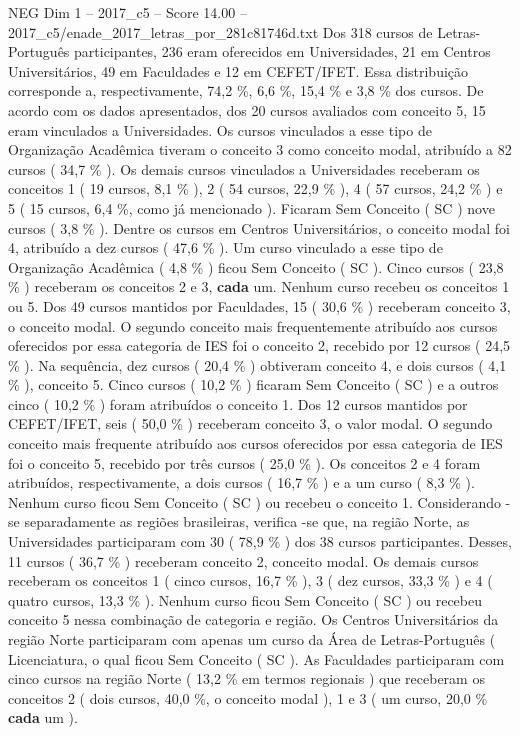 \begin{textsample}{NEG Dim 1 – 2017\_c5 – Score 14.00 – 2017\_c5/enade\_2017\_letras\_por\_281c81746d.txt}
Dos 318 cursos de Letras-Português participantes, 236 eram oferecidos em Universidades, 21 em Centros Universitários, 49 em Faculdades e 12 em CEFET/IFET.
Essa distribuição corresponde a, respectivamente, 74,2 \%, 6,6 \%, 15,4 \% e 3,8 \% dos cursos.
De acordo com os dados apresentados, dos 20 cursos avaliados com conceito 5, 15 eram vinculados a Universidades.
Os cursos vinculados a esse tipo de Organização Acadêmica tiveram o conceito 3 como conceito modal, atribuído a 82 cursos ( 34,7 \% ).
Os demais cursos vinculados a Universidades receberam os conceitos 1 ( 19 cursos, 8,1 \% ), 2 ( 54 cursos, 22,9 \% ), 4 ( 57 cursos, 24,2 \% ) e 5 ( 15 cursos, 6,4 \%, como já mencionado ).
Ficaram Sem Conceito ( SC ) nove cursos ( 3,8 \% ).
Dentre os cursos em Centros Universitários, o conceito modal foi 4, atribuído a dez cursos ( 47,6 \% ).
Um curso vinculado a esse tipo de Organização Acadêmica ( 4,8 \% ) ficou Sem Conceito ( SC ).
Cinco cursos ( 23,8 \% ) receberam os conceitos 2 e 3, \textbf{cada} um.
Nenhum curso recebeu os conceitos 1 ou 5.
Dos 49 cursos mantidos por Faculdades, 15 ( 30,6 \% ) receberam conceito 3, o conceito modal.
O segundo conceito mais frequentemente atribuído aos cursos oferecidos por essa categoria de IES foi o conceito 2, recebido por 12 cursos ( 24,5 \% ).
Na sequência, dez cursos ( 20,4 \% ) obtiveram conceito 4, e dois cursos ( 4,1 \% ), conceito 5.
Cinco cursos ( 10,2 \% ) ficaram Sem Conceito ( SC ) e a outros cinco ( 10,2 \% ) foram atribuídos o conceito 1.
Dos 12 cursos mantidos por CEFET/IFET, seis ( 50,0 \% ) receberam conceito 3, o valor modal.
O segundo conceito mais frequente atribuído aos cursos oferecidos por essa categoria de IES foi o conceito 5, recebido por três cursos ( 25,0 \% ).
Os conceitos 2 e 4 foram atribuídos, respectivamente, a dois cursos ( 16,7 \% ) e a um curso ( 8,3 \% ).
Nenhum curso ficou Sem Conceito ( SC ) ou recebeu o conceito 1.
Considerando -se separadamente as regiões brasileiras, verifica -se que, na região Norte, as Universidades participaram com 30 ( 78,9 \% ) dos 38 cursos participantes.
Desses, 11 cursos ( 36,7 \% ) receberam conceito 2, conceito modal.
Os demais cursos receberam os conceitos 1 ( cinco cursos, 16,7 \% ), 3 ( dez cursos, 33,3 \% ) e 4 ( quatro cursos, 13,3 \% ).
Nenhum curso ficou Sem Conceito ( SC ) ou recebeu conceito 5 nessa combinação de categoria e região.
Os Centros Universitários da região Norte participaram com apenas um curso da Área de Letras-Português ( Licenciatura, o qual ficou Sem Conceito ( SC ).
As Faculdades participaram com cinco cursos na região Norte ( 13,2 \% em termos regionais ) que receberam os conceitos 2 ( dois cursos, 40,0 \%, o conceito modal ), 1 e 3 ( um curso, 20,0 \% \textbf{cada} um ).

\end{textsample}
